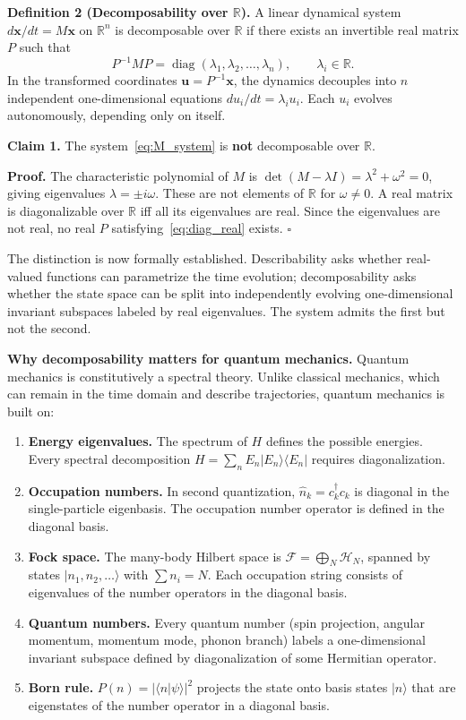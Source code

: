 \documentclass[aps,pra,preprint,groupedaddress,amsmath,amssymb,floatfix]{revtex4-2}
\begin{document}
\textbf{Definition 2 (Decomposability over $\mathbb{R}$).} A linear dynamical system $d\mathbf{x}/dt = M\mathbf{x}$ on $\mathbb{R}^n$ is decomposable over $\mathbb{R}$ if there exists an invertible real matrix $P$ such that
\begin{equation}
P^{-1}MP = \operatorname{diag}(\lambda_1, \lambda_2, \dots, \lambda_n),\qquad \lambda_i \in \mathbb{R}. \label{eq:diag_real}
\end{equation}
In the transformed coordinates $\mathbf{u} = P^{-1}\mathbf{x}$, the dynamics decouples into $n$ independent one-dimensional equations $du_i/dt = \lambda_i u_i$. Each $u_i$ evolves autonomously, depending only on itself.

\textbf{Claim 1.} The system~\eqref{eq:M_system} is \textbf{not} decomposable over $\mathbb{R}$.

\textbf{Proof.} The characteristic polynomial of $M$ is $\det(M-\lambda I) = \lambda^2 + \omega^2 = 0$, giving eigenvalues $\lambda = \pm i\omega$. These are not elements of $\mathbb{R}$ for $\omega \neq 0$. A real matrix is diagonalizable over $\mathbb{R}$ iff all its eigenvalues are real. Since the eigenvalues are not real, no real $P$ satisfying~\eqref{eq:diag_real} exists. $\square$

The distinction is now formally established. Describability asks whether real-valued functions can parametrize the time evolution; decomposability asks whether the state space can be split into independently evolving one-dimensional invariant subspaces labeled by real eigenvalues. The system admits the first but not the second.

\textbf{Why decomposability matters for quantum mechanics.} Quantum mechanics is constitutively a spectral theory. Unlike classical mechanics, which can remain in the time domain and describe trajectories, quantum mechanics is built on:

\begin{enumerate}
\item[\textbf{1.}] \textbf{Energy eigenvalues.} The spectrum of $H$ defines the possible energies. Every spectral decomposition $H = \sum_n E_n |E_n\rangle\langle E_n|$ requires diagonalization.
\item[\textbf{2.}] \textbf{Occupation numbers.} In second quantization, $\hat{n}_k = c^\dagger_k c_k$ is diagonal in the single-particle eigenbasis. The occupation number operator is defined in the diagonal basis.
\item[\textbf{3.}] \textbf{Fock space.} The many-body Hilbert space is $\mathcal{F} = \bigoplus_N \mathcal{H}_N$, spanned by states $|n_1, n_2, \ldots\rangle$ with $\sum n_i = N$. Each occupation string consists of eigenvalues of the number operators in the diagonal basis.
\item[\textbf{4.}] \textbf{Quantum numbers.} Every quantum number (spin projection, angular momentum, momentum mode, phonon branch) labels a one-dimensional invariant subspace defined by diagonalization of some Hermitian operator.
\item[\textbf{5.}] \textbf{Born rule.} $P(n) = |\langle n|\psi\rangle|^2$ projects the state onto basis states $|n\rangle$ that are eigenstates of the number operator in a diagonal basis.
\end{enumerate}
\end{document}
